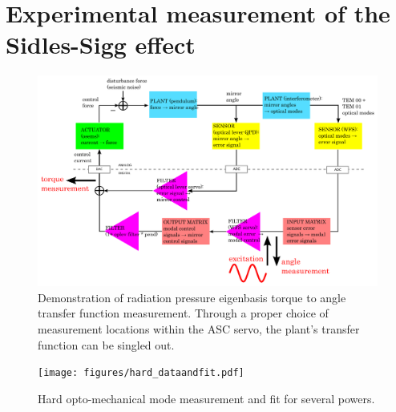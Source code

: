 




\section{Experimental measurement of the Sidles-Sigg effect}


\begin{figure}
\begin{centering}
\includegraphics[width=1.0\textwidth]{figures/ascservo_measurement.pdf}
\caption{Demonstration of radiation pressure eigenbasis torque to
  angle transfer function measurement. Through a proper choice of measurement
  locations within the ASC servo, the plant's transfer function can be
  singled out.}
\label{fig:RPTFmeasurement}
\end{centering}
\end{figure}



\begin{figure}
\begin{centering}
\texttt{[image: figures/hard\_dataandfit.pdf]}
\caption{Hard opto-mechanical mode measurement and fit for several
 powers.}
\label{fig:hardTF}
\end{centering}
\end{figure}



